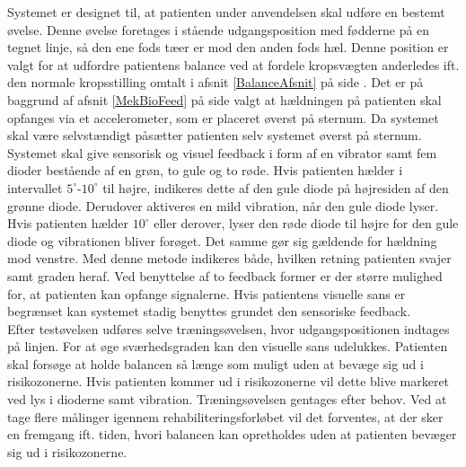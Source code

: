 Systemet er designet til, at patienten under anvendelsen skal udføre en bestemt øvelse. Denne øvelse foretages i stående udgangsposition med fødderne på en tegnet linje, så den ene fods tæer er mod den anden fods hæl. Denne position er valgt for at udfordre patientens balance ved at fordele kropsvægten anderledes ift. den normale kropsstilling omtalt i afsnit \ref{BalanceAfsnit} på side \pageref{BalanceAfsnit}. 
Det er på baggrund af afsnit \ref{MekBioFeed} på side \pageref{MekBioFeed} valgt at hældningen på patienten skal opfanges via et accelerometer, som er placeret øverst på sternum. Da systemet skal være selvstændigt påsætter patienten selv systemet øverst på sternum. Systemet skal give sensorisk og visuel feedback i form af en vibrator samt fem dioder bestående af en grøn, to gule og to røde. Hvis patienten hælder i intervallet $5^{\circ}$-$10^{\circ}$   til højre, indikeres dette af den gule diode på højresiden af den grønne diode. Derudover aktiveres en mild vibration, når den gule diode lyser. Hvis patienten hælder $10^{\circ}$ eller derover, lyser den røde diode til højre for den gule diode og vibrationen bliver forøget. Det samme gør sig gældende for hældning mod venstre. Med denne metode indikeres både, hvilken retning patienten svajer samt graden heraf. Ved benyttelse af to feedback former er der større mulighed for, at patienten kan opfange signalerne. Hvis patientens visuelle sans er begrænset kan systemet stadig benyttes grundet den sensoriske feedback. \\ 
Efter testøvelsen udføres selve træningsøvelsen, hvor udgangspositionen indtages på linjen. For at øge sværhedsgraden kan den visuelle sans udelukkes. Patienten skal forsøge at holde balancen så længe som muligt uden at bevæge sig ud i risikozonerne. Hvis patienten kommer ud i risikozonerne vil dette blive markeret ved lys i dioderne samt vibration. Træningsøvelsen gentages efter behov. Ved at tage flere målinger igennem rehabiliteringsforløbet vil det forventes, at der sker en fremgang ift. tiden, hvori balancen kan opretholdes uden at patienten bevæger sig ud i risikozonerne. 


